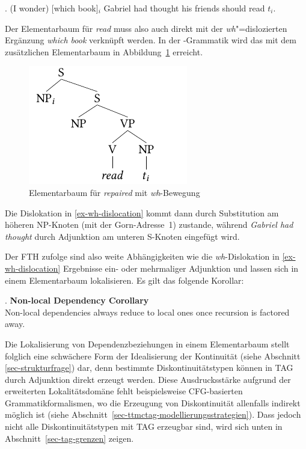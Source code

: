 \ex. \label{ex-wh-dislocation}  (I wonder) [which book]$_i$ Gabriel had thought his friends should read $t_i$. \hfill \citep[25]{Frank:02}

Der Elementarbaum für {\it read} muss also auch direkt mit der \textit{wh}"=dislozierten Ergänzung {\it which book} verknüpft werden. In der -Grammatik wird das mit dem zusätzlichen Elementarbaum in Abbildung~\ref{fig-TAG-bsp1-2} erreicht. 
\begin{figure}[t]
\centering
\includegraphics{graphics/abb57.pdf}
\caption{\label{fig-TAG-bsp1-2}Elementarbaum für {\it repaired} mit \textit{wh}-Bewegung}
\end{figure}
Die Dislokation in \ref{ex-wh-dislocation} kommt dann durch Substitution am höheren NP-Knoten (mit der Gorn-Adresse~1) zustande, während \textit{Gabriel had thought} durch Adjunktion am unteren S-Knoten eingefügt wird.

Der FTH zufolge sind also weite Abhängigkeiten wie die \textit{wh}-Dislokation in \ref{ex-wh-dislocation} Ergebnisse ein- oder mehrmaliger Adjunktion und lassen sich in einem Elementarbaum lokalisieren. Es gilt das folgende Korollar:

\ex. {\bf Non-local Dependency Corollary} \\
Non-local dependencies always reduce to local ones once recursion is factored away.
\citep[27]{Frank:02}

Die Lokalisierung von Dependenzbeziehungen in einem Elementarbaum stellt folglich eine schwächere Form der Idealisierung der Kontinuität (siehe Abschnitt \ref{sec-strukturfrage}) dar, denn bestimmte Diskontinuitätstypen können in TAG durch Adjunktion direkt erzeugt werden. Diese Ausdrucksstärke aufgrund der erweiterten Lokalitätsdomäne fehlt beispielsweise CFG-basierten Grammatikformalismen, wo die Erzeugung von Diskontinuität allenfalls indirekt möglich ist (siehe Abschnitt~\ref{sec-ttmctag-modellierungsstrategien}). Dass jedoch nicht alle Diskontinuitätstypen mit TAG erzeugbar sind, wird sich unten in Abschnitt~\ref{sec-tag-grenzen} zeigen. %


